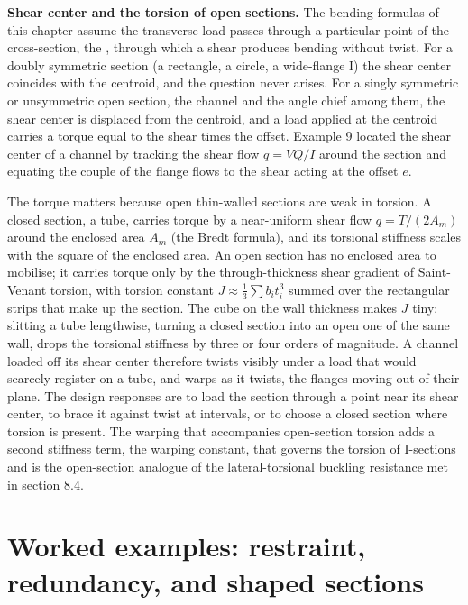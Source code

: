 \begin{mastery}
\textbf{Shear center and the torsion of open sections.} The bending
formulas of this chapter assume the transverse load passes through a
particular point of the cross-section, the ,
through which a shear produces bending without twist. For a doubly
symmetric section (a rectangle, a circle, a wide-flange I) the shear
center coincides with the centroid, and the question never arises. For a
singly symmetric or unsymmetric open section, the channel and the angle
chief among them, the shear center is displaced from the centroid, and a
load applied at the centroid carries a torque equal to the shear times
the offset. Example 9 located the shear center of a channel by tracking
the shear flow $q = VQ/I$ around the section and equating the couple of
the flange flows to the shear acting at the offset $e$.

The torque matters because open thin-walled sections are weak in
torsion. A closed section, a tube, carries torque by a near-uniform
shear flow $q = T/(2A_m)$ around the enclosed area $A_m$ (the Bredt
formula), and its torsional stiffness scales with the square of the
enclosed area. An open section has no enclosed area to mobilise; it
carries torque only by the through-thickness shear gradient of
Saint-Venant torsion, with torsion constant $J \approx \tfrac13 \sum b_i
t_i^3$ summed over the rectangular strips that make up the section. The
cube on the wall thickness makes $J$ tiny: slitting a tube lengthwise,
turning a closed section into an open one of the same wall, drops the
torsional stiffness by three or four orders of magnitude. A channel
loaded off its shear center therefore twists visibly under a load that
would scarcely register on a tube, and warps as it twists, the flanges
moving out of their plane. The design responses are to load the section
through a point near its shear center, to brace it against twist at
intervals, or to choose a closed section where torsion is present. The
warping that accompanies open-section torsion adds a second stiffness
term, the warping constant, that governs the torsion of I-sections and
is the open-section analogue of the lateral-torsional buckling
resistance met in section 8.4.
\end{mastery}

\section{Worked examples: restraint, redundancy, and shaped
sections}

